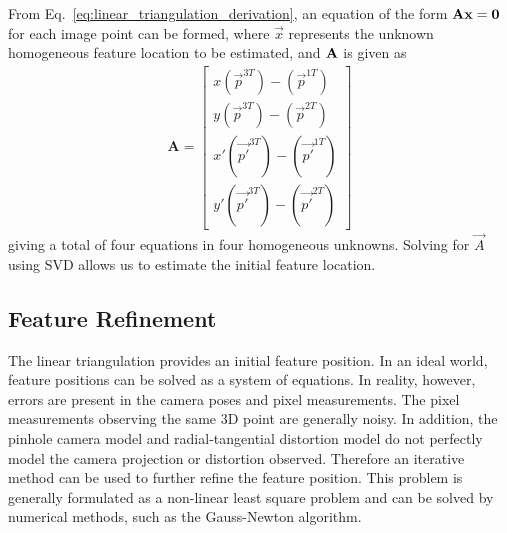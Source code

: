 From Eq.~\eqref{eq:linear_triangulation_derivation}, an equation of the form
${\mathbf{A}} {\mathbf{x}} = {\mathbf{0}}$ for each image point can be formed, where
$\Vec{x}$ represents the unknown homogeneous feature location to be
estimated, and ${\mathbf{A}}$ is given as
%
\begin{align}
  \mathbf{A} =
  \begin{bmatrix}
    x (\Vec{p}^{3T}) - (\Vec{p}^{1T}) \\
    y (\Vec{p}^{3T}) - (\Vec{p}^{2T}) \\
    x' (\Vec{p'}^{3T}) - (\Vec{p'}^{1T}) \\
    y' (\Vec{p'}^{3T}) - (\Vec{p'}^{2T})
  \end{bmatrix}
  \label{eq:linear_triangulation_ derivation}
\end{align}
%
giving a total of four equations in four homogeneous unknowns. Solving for
$\Vec{A}$ using SVD allows us to estimate the initial feature location.


\subsection{Feature Refinement}
\label{subsec:bundle_adjustment}

The linear triangulation provides an initial feature position. In an ideal
world, feature positions can be solved as a system of equations. In reality,
however, errors are present in the camera poses and pixel measurements. The
pixel measurements observing the same 3D point are generally noisy. In
addition, the pinhole camera model and radial-tangential distortion model do
not perfectly model the camera projection or distortion observed. Therefore an
iterative method can be used to further refine the feature position. This
problem is generally formulated as a non-linear least square problem and can be
solved by numerical methods, such as the Gauss-Newton algorithm.


